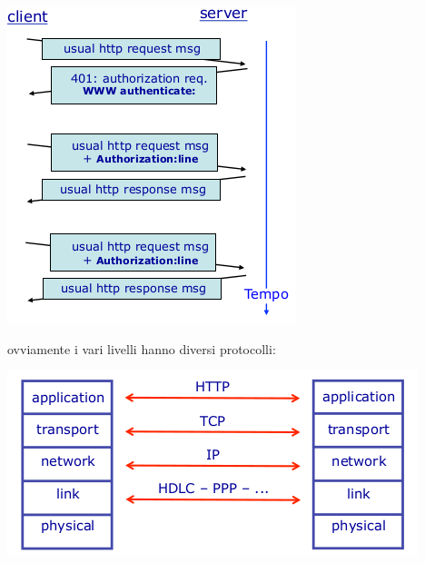 \documentclass[a4paper,12pt, oneside]{book}
\begin{document}
\begin{center}
\includegraphics[scale=0.7]{img/http6.png}
\end{center}
ovviamente i vari livelli hanno diversi protocolli:
\begin{center}
\includegraphics[scale=0.7]{img/http7.png}
\end{center}
\end{document}
